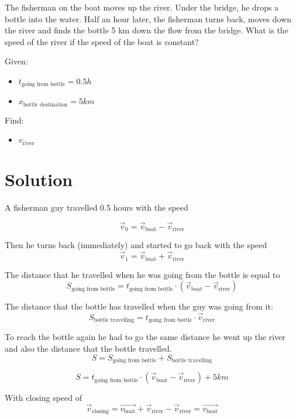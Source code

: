 The fisherman on the boat moves up the river. Under the bridge, he drops a bottle into the water.
Half an hour later, the fisherman turns back, moves down the river and finds the bottle 5 km
down the flow from the bridge. What is the speed of the river if the speed of the boat is constant?

\bigbreak Given: \begin{itemize}
    \item $t_{\text{going from bottle}} = 0.5h$
    \item $x_{\text{bottle destination}} = 5km$
\end{itemize}

Find: \begin{itemize}
    \item $v_{\text{river}}$
\end{itemize}

\section*{Solution}

A fisherman guy travelled 0.5 hours with the speed

$$\Vec{v}_0 = \Vec{v}_{\text{boat}} - \Vec{v}_{\text{river}}$$

Then he turns back (immediately) and started to go back with the speed
\begin{equation}
    \label{eq:1}
    \Vec{v}_1 = \Vec{v}_{\text{boat}} + \Vec{v}_{\text{river}}
\end{equation}

The distance that he travelled when he was going from the bottle is equal to
$$S_{\text{going from bottle}} = t_{\text{going from bottle}} \cdot (\Vec{v}_{\text{boat}} - \Vec{v}_{\text{river}})$$

The distance that the bottle has travelled when the guy was going from it:
$$S_{\text{bottle travelling}} = t_{\text{going from bottle}} \cdot \Vec{v}_{\text{river}}$$

To reach the bottle again he had to go the same distance he went up the river and also the distance that the bottle travelled.
$$S = S_{\text{going from bottle}} + S_{\text{bottle travelling}}$$

\begin{equation}
    \label{eq:2}
    S = t_{\text{going from bottle}} \cdot (\Vec{v}_{\text{boat}} - \Vec{v}_{\text{river}}) + 5km
\end{equation}

With closing speed of
$$\Vec{v}_\text{closing} = \Vec{v_\text{boat}} + \Vec{v}_\text{river} - \Vec{v}_\text{river} = \Vec{v_\text{boat}}$$

